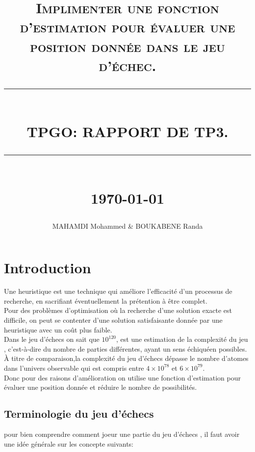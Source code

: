 \documentclass[12pt]{report}
\newcommand{\HRule}[1]{\rule{\linewidth}{#1}}
\begin{document}
\renewcommand{\contentsname}{Table des Matières}
\renewcommand{\listfigurename}{Table des Figures}
\author{MAHAMDI Mohammed & BOUKABENE Randa }       
\date{} 
\title{  \textsc{ Implimenter une fonction d'estimation pour évaluer une position donnée dans le jeu d'échec.}
		\\ [2.0cm]
		\HRule{0.5pt} \\
		\LARGE \textbf{\uppercase{TPGO:  Rapport de TP3. }}
		\HRule{2pt} \\ [0.5cm]
		\normalsize \today \vspace*{5\baselineskip}}
\maketitle
\tableofcontents
\newpage
\listoffigures 
\newpage
\sectionfont{\scshape}
\newpage
	\chapter{Introduction}
	
	Une heuristique est une technique qui améliore l'efficacité d'un
	processus de recherche, en sacrifiant éventuellement la prétention
	à être complet.\\
	
	Pour des problèmes d'optimisation où la recherche d'une solution
	exacte est difficile, on peut se contenter d'une solution satisfaisante donnée par une heuristique	avec un coût plus faible.\\
	
	Dans le jeu d'échecs on sait que  $10^{120}$, est une estimation de la complexité du jeu , c'est-à-dire du nombre de parties différentes, ayant un sens échiquéen possibles.\\
	
	 À titre de comparaison,la complexité du jeu d'échecs dépasse le  nombre d'atomes dans l'univers observable qui est compris entre $4×10^{78}$ et $6×10^{79}$.\\
	
	Donc pour des raisons d'amélioration on utilise une fonction d'estimation pour évaluer une position donnée et réduire le nombre de possibilités. 
	 
	\newpage
	\section{Terminologie du jeu d'échecs}
	pour bien comprendre comment joeur une partie du jeu d'échecs , il faut avoir une idée générale sur les concepte suivants:
	
\end{document}
